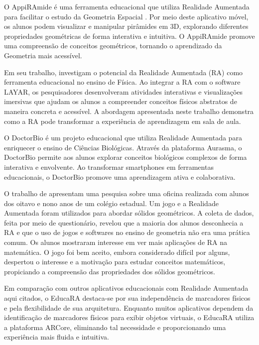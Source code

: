 \documentclass[12pt]{article}
\begin{document}
O AppiRAmide é uma ferramenta educacional que utiliza Realidade Aumentada para facilitar o estudo da Geometria Espacial \cite{de2016usando}. Por meio deste aplicativo móvel, os alunos podem visualizar e manipular pirâmides em 3D, explorando diferentes propriedades geométricas de forma interativa e intuitiva. O AppiRAmide promove uma compreensão de conceitos geométricos, tornando o aprendizado da Geometria mais acessível.

Em seu trabalho, \cite{denardin2017desenvolvimento} investigam o potencial da Realidade Aumentada (RA) como ferramenta educacional no ensino de Física. Ao integrar a RA com o software LAYAR, os pesquisadores desenvolveram atividades interativas e visualizações imersivas que ajudam os alunos a compreender conceitos físicos abstratos de maneira concreta e acessível. A abordagem apresentada neste trabalho demonstra como a RA pode transformar a experiência de aprendizagem em sala de aula.

O DoctorBio \cite{araujo2017doctorbio} é um projeto educacional que utiliza Realidade Aumentada para enriquecer o ensino de Ciências Biológicas. Através da plataforma Aurasma, o DoctorBio permite aos alunos explorar conceitos biológicos complexos de forma interativa e envolvente. Ao transformar smartphones em ferramentas educacionais, o DoctorBio promove uma aprendizagem ativa e colaborativa.

O trabalho de \cite{palhano2019realidade} apresentam uma pesquisa sobre uma oficina realizada com alunos dos oitavo e nono anos de um colégio estadual. Um jogo e a Realidade Aumentada foram utilizados para abordar sólidos geométricos. A coleta de dados, feita por meio de questionário, revelou que a maioria dos alunos desconhecia a RA e que o uso de jogos e softwares no ensino de geometria não era uma prática comum. Os alunos mostraram interesse em ver mais aplicações de RA na matemática. O jogo foi bem aceito, embora considerado difícil por alguns, despertou o interesse e a motivação para estudar conceitos matemáticos, propiciando a compreensão das propriedades dos sólidos geométricos.

Em comparação com outros aplicativos educacionais com Realidade Aumentada aqui citados, o EducaRA destaca-se por sua independência de marcadores físicos e pela flexibilidade de sua arquitetura. Enquanto muitos aplicativos dependem da identificação de marcadores físicos para exibir objetos virtuais, o EducaRA utiliza a plataforma ARCore, eliminando tal necessidade e proporcionando uma experiência mais fluida e intuitiva. 
\end{document}

